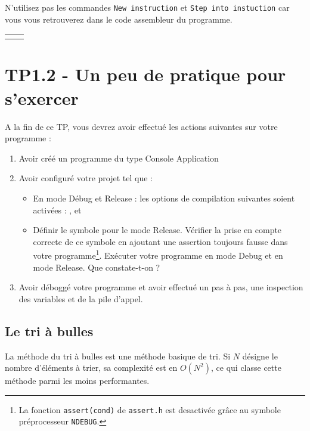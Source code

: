 \begin{commonerrors}
N'utilisez pas les commandes \verb-New instruction- et \verb-Step into instuction- car vous vous retrouverez dans le code assembleur du programme. 
\end{commonerrors}



\begin{center} 
\begin{tabu}{X[c,m]X[c,m]}
&
\end{tabu}
\end{center}


\chapter{TP1.2 - Un peu de pratique pour s'exercer}
    
A la fin de ce TP, vous devrez avoir effectué les actions suivantes sur votre programme :
\begin{enumerate}
  \item Avoir créé un programme du type \og{}Console Application\fg{}
  \item Avoir configuré votre projet tel que :
    \begin{itemize}
      \item En mode Débug et Release : les options de compilation suivantes soient activées :
      ,  et
      \item Définir le symbole  pour le mode Release. Vérifier la prise en compte correcte de ce symbole en ajoutant une assertion toujours fausse dans votre programme\footnote{La fonction \texttt{assert(cond)} de \texttt{assert.h} est desactivée grâce au symbole préprocesseur \texttt{NDEBUG}.}. Exécuter votre programme en mode Debug et en mode Release. Que constate-t-on ?
    \end{itemize}
  \item Avoir déboggé votre programme et avoir effectué un pas à pas, une inspection des variables et de la pile d'appel.
\end{enumerate}



\section{Le tri à bulles}

La méthode du tri à bulles est une méthode basique de tri. Si $N$ désigne le
nombre d'éléments à trier, sa complexité est en $O(N^2)$, ce qui classe cette
méthode parmi les moins performantes.

